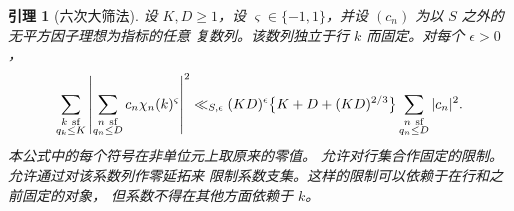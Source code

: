 \documentclass[11pt,a4paper]{article}
\numberwithin{equation}{section}
\numberwithin{figure}{section}
\newtheorem{lemma}[theorem]{引理}
\theoremstyle{definition}
\theoremstyle{remark}
\begin{document}
\begin{lemma}[六次大筛法]\label{lem:sextic-large-sieve}
设 $K,D\ge1$，设 $\varsigma\in\{-1,1\}$，并设 $(c_n)$ 为以 $S$ 之外的无平方因子理想为指标的任意
复数列。该数列独立于行 $k$ 而固定。对每个
$\epsilon>0$，
\begin{equation}\label{eq:sextic-large-sieve}
 \sum_{\substack{k\ {\rm sf}\\q_k\le K}}
 \left|\sum_{\substack{n\ {\rm sf}\\q_n\le D}}
       c_n\chi_n(k)^{\varsigma}\right|^2
 \ll_{S,\epsilon}(KD)^\epsilon
       \bigl\{K+D+(KD)^{2/3}\bigr\}
       \sum_{\substack{n\ {\rm sf}\\q_n\le D}}|c_n|^2.
\end{equation}
本公式中的每个符号在非单位元上取原来的零值。
允许对行集合作固定的限制。允许通过对该系数列作零延拓来
限制系数支集。这样的限制可以依赖于在行和之前固定的对象，
但系数不得在其他方面依赖于 $k$。
\end{lemma}
\end{document}
